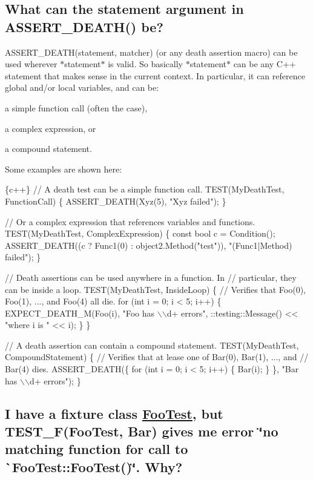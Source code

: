 \subsection*{What can the statement argument in A\+S\+S\+E\+R\+T\+\_\+\+D\+E\+A\+T\+H() be?}

{\ttfamily A\+S\+S\+E\+R\+T\+\_\+\+D\+E\+A\+T\+H(statement, matcher)} (or any death assertion macro) can be used wherever $\ast${\ttfamily statement}$\ast$ is valid. So basically $\ast${\ttfamily statement}$\ast$ can be any C++ statement that makes sense in the current context. In particular, it can reference global and/or local variables, and can be\+:


\begin{DoxyItemize}
\item a simple function call (often the case),
\item a complex expression, or
\item a compound statement.
\end{DoxyItemize}

Some examples are shown here\+:


\begin{DoxyCode}
\{c++\}
// A death test can be a simple function call.
TEST(MyDeathTest, FunctionCall) \{
  ASSERT\_DEATH(Xyz(5), "Xyz failed");
\}

// Or a complex expression that references variables and functions.
TEST(MyDeathTest, ComplexExpression) \{
  const bool c = Condition();
  ASSERT\_DEATH((c ? Func1(0) : object2.Method("test")),
               "(Func1|Method) failed");
\}

// Death assertions can be used anywhere in a function.  In
// particular, they can be inside a loop.
TEST(MyDeathTest, InsideLoop) \{
  // Verifies that Foo(0), Foo(1), ..., and Foo(4) all die.
  for (int i = 0; i < 5; i++) \{
    EXPECT\_DEATH\_M(Foo(i), "Foo has \(\backslash\)\(\backslash\)d+ errors",
                   ::testing::Message() << "where i is " << i);
  \}
\}

// A death assertion can contain a compound statement.
TEST(MyDeathTest, CompoundStatement) \{
  // Verifies that at lease one of Bar(0), Bar(1), ..., and
  // Bar(4) dies.
  ASSERT\_DEATH(\{
    for (int i = 0; i < 5; i++) \{
      Bar(i);
    \}
  \},
  "Bar has \(\backslash\)\(\backslash\)d+ errors");
\}
\end{DoxyCode}


\subsection*{I have a fixture class {\ttfamily \mbox{\hyperlink{classFooTest}{Foo\+Test}}}, but {\ttfamily T\+E\+S\+T\+\_\+\+F(\+Foo\+Test, Bar)} gives me error {\ttfamily \char`\"{}no matching function for call to \`{}\+Foo\+Test\+::\+Foo\+Test()\textquotesingle{}\char`\"{}}. Why?}

